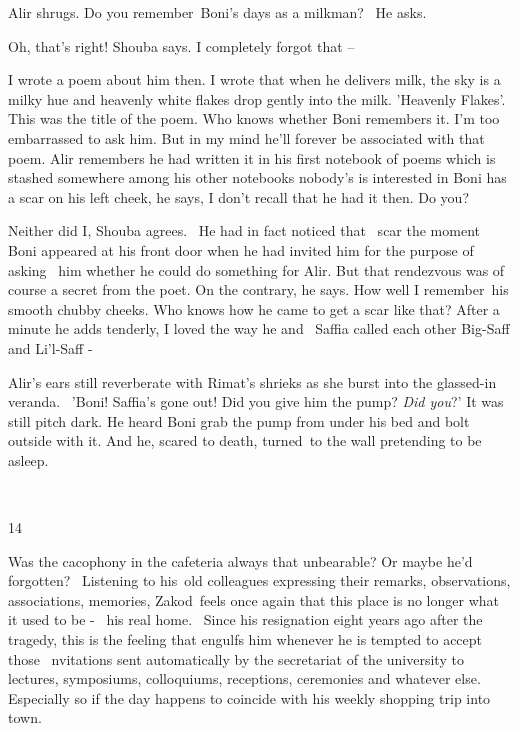 \documentclass[letterpaper]{article}
\begin{document}
Alir shrugs. {\textquotedbl}Do you remember~Boni's days as a milkman?{\textquotedbl} \ He asks. 

{\textquotedbl}Oh, that's right!{\textquotedbl} Shouba says. {\textquotedbl}I completely forgot that --{\textquotedbl}

{\textquotedbl}I wrote a poem about him then. I wrote that when he delivers milk, the sky is a milky hue and heavenly
white flakes drop gently into the milk. 'Heavenly Flakes'. This was the title of the poem. Who knows whether Boni
remembers it. I'm too embarrassed to ask him. But in my mind he'll forever be associated with that poem.{\textquotedbl}
Alir remembers he had written it in his first notebook of poems which is stashed somewhere among his other notebooks
nobody's is interested in {\textquotedbl}Boni has a scar on his left cheek,{\textquotedbl} he says, {\textquotedbl}I
don't recall that he had it then. Do you?{\textquotedbl} \ 

{\textquotedbl}Neither did I,{\textquotedbl} Shouba agrees. \ He had in fact noticed that \ scar the moment Boni
appeared at his front door when he had invited him for the purpose of asking \ him whether he could do something for
Alir. But that rendezvous was of course a secret from the poet. {\textquotedbl}On the contrary,{\textquotedbl} he says.
{\textquotedbl}How well I remember~his smooth chubby cheeks. Who knows how he came to get a scar like
that?{\textquotedbl} After a minute he adds tenderly, {\textquotedbl}I loved the way he and~ Saffia called each other
Big-Saff and Li'l-Saff -{\textquotedbl}

Alir's ears still reverberate with Rimat's shrieks as she burst into the glassed-in veranda. \ {}'Boni! Saffia's gone
out! Did you give him the pump? \textit{Did you}?' It was still pitch dark. He heard Boni grab the pump from under his
bed and bolt outside with it. And he, scared to death, turned~to the wall pretending to be asleep.

~

14 

Was the cacophony in the cafeteria always that unbearable? Or maybe he'd forgotten? ~Listening to his~old colleagues
expressing their remarks, observations, associations, memories, Zakod~feels once again that this place is no longer
what it used to be -~ his real home. ~Since his resignation eight years ago after the tragedy, this is the feeling that
engulfs him whenever he is tempted to accept those \ nvitations sent automatically by the secretariat of the university
to lectures, symposiums, colloquiums, receptions, ceremonies and whatever else. Especially so if the day happens to
coincide with his weekly shopping trip into town. 
\end{document}
